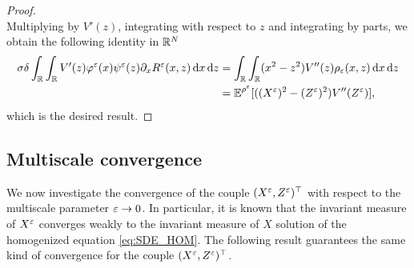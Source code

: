 \documentclass[10pt]{article}
\begin{document}
\begin{proof}
\begin{equation}
\end{equation}
Multiplying by $V'(z)$, integrating with respect to $z$ and integrating by parts, we obtain the following identity in $\mathbb{R}^N$
\begin{equation}
\begin{aligned}
\sigma \delta \int_{\mathbb{R}} \int_{\mathbb{R}} V'(z) \varphi^\varepsilon(x) \psi^\varepsilon(z) \partial_x R^\varepsilon(x,z) \,\mathrm{d} x \,\mathrm{d} z &=  \int_{\mathbb{R}} \int_{\mathbb{R}} (x^2 - z^2) V''(z) \rho_\varepsilon(x,z) \,\mathrm{d} x \,\mathrm{d} z \\
&= \operatorname{\mathbb{E}}^{\rho^\varepsilon}[((X^\varepsilon)^2 - (Z^\varepsilon)^2)V''(Z^\varepsilon)],
\end{aligned}
\end{equation}
which is the desired result.
\end{proof}

\subsection{Multiscale convergence}\label{sec:convMS}

We now investigate the convergence of the couple $(X^\varepsilon, Z^\varepsilon)^\top$ with respect to the multiscale parameter $\varepsilon \to 0$. In particular, it is known that the invariant measure of $X^\varepsilon$ converges weakly to the invariant measure of $X$ solution of the homogenized equation \eqref{eq:SDE_HOM}. The following result guarantees the same kind of convergence for the couple $(X^\varepsilon, Z^\varepsilon)^\top$.
\end{document}
